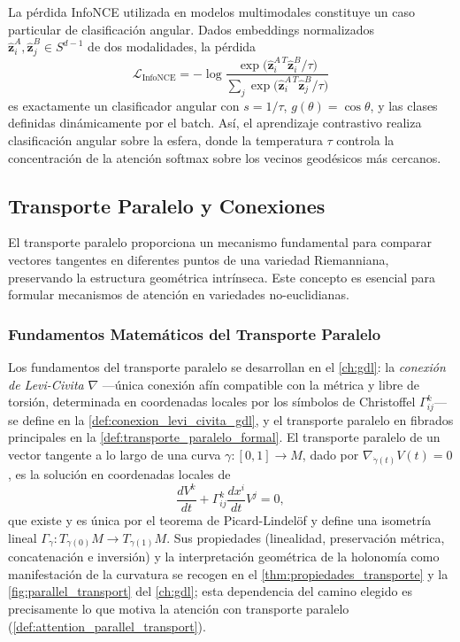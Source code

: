 \begin{remark}\label{rem:contrastive_sphere}
La pérdida InfoNCE utilizada en modelos multimodales constituye un caso particular de clasificación angular. Dados embeddings normalizados $\hat{\mathbf{z}}_i^A, \hat{\mathbf{z}}_j^B \in S^{d-1}$ de dos modalidades, la pérdida
\[
\mathcal{L}_{\text{InfoNCE}} = -\log \frac{\exp\bigl(\hat{\mathbf{z}}_i^{A\,T} \hat{\mathbf{z}}_i^B / \tau\bigr)}{\sum_{j} \exp\bigl(\hat{\mathbf{z}}_i^{A\,T} \hat{\mathbf{z}}_j^B / \tau\bigr)}
\]
es exactamente un clasificador angular con $s = 1/\tau$, $g(\theta) = \cos\theta$, y las clases definidas dinámicamente por el batch. Así, el aprendizaje contrastivo realiza clasificación angular sobre la esfera, donde la temperatura $\tau$ controla la concentración de la atención softmax sobre los vecinos geodésicos más cercanos.
\end{remark}

\subsection{Transporte Paralelo y Conexiones}

El transporte paralelo proporciona un mecanismo fundamental para comparar vectores tangentes en diferentes puntos de una variedad Riemanniana, preservando la estructura geométrica intrínseca. Este concepto es esencial para formular mecanismos de atención en variedades no-euclidianas.

\subsubsection{Fundamentos Matemáticos del Transporte Paralelo}

Los fundamentos del transporte paralelo se desarrollan en el \autoref{ch:gdl}: la \textit{conexión de Levi-Civita} $\nabla$ —única conexión afín compatible con la métrica y libre de torsión, determinada en coordenadas locales por los símbolos de Christoffel $\Gamma^k_{ij}$— se define en la \autoref{def:conexion_levi_civita_gdl}, y el transporte paralelo en fibrados principales en la \autoref{def:transporte_paralelo_formal}. El transporte paralelo de un vector tangente a lo largo de una curva $\gamma: [0,1] \to M$, dado por $\nabla_{\dot{\gamma}(t)} V(t) = 0$, es la solución en coordenadas locales de
\begin{equation}
\frac{dV^k}{dt} + \Gamma^k_{ij} \frac{dx^i}{dt} V^j = 0,
\label{eq:parallel_transport_coordinates}
\end{equation}
que existe y es única por el teorema de Picard-Lindelöf y define una isometría lineal $\Gamma_\gamma: T_{\gamma(0)}M \to T_{\gamma(1)}M$. Sus propiedades (linealidad, preservación métrica, concatenación e inversión) y la interpretación geométrica de la holonomía como manifestación de la curvatura se recogen en el \autoref{thm:propiedades_transporte} y la \autoref{fig:parallel_transport} del \autoref{ch:gdl}; esta dependencia del camino elegido es precisamente lo que motiva la atención con transporte paralelo (\autoref{def:attention_parallel_transport}).

